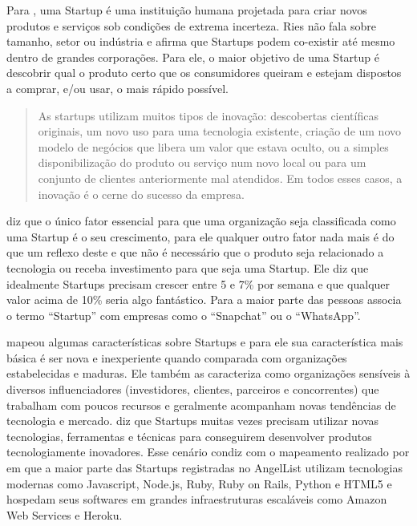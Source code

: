 Para , uma Startup é uma instituição humana projetada para criar novos produtos e serviços sob condições de extrema incerteza. Ries não fala sobre tamanho, setor ou indústria e afirma que Startups podem co-existir até mesmo dentro de grandes corporações. Para ele, o maior objetivo de uma Startup é descobrir qual o produto certo que os consumidores queiram e estejam dispostos a comprar, e/ou usar, o mais rápido possível. 

\begin{quote}
As startups utilizam muitos tipos de inovação: descobertas científicas originais, um novo uso para uma tecnologia existente, criação de um novo modelo de negócios que libera um valor que estava oculto, ou a simples disponibilização do produto ou serviço num novo local ou para um conjunto de clientes anteriormente mal atendidos. Em todos esses casos, a inovação é o cerne do sucesso da empresa. \cite{Ries2011}
\end{quote}

 diz que o único fator essencial para que uma organização seja classificada como uma Startup é o seu crescimento, para ele qualquer outro fator nada mais é do que um reflexo deste e que não é necessário que o produto seja relacionado a tecnologia ou receba investimento para que seja uma Startup. Ele diz que idealmente Startups precisam crescer entre 5 e 7\% por semana e que qualquer valor acima de 10\% seria algo fantástico. Para  a maior parte das pessoas associa o termo ``Startup'' com empresas como o ``Snapchat'' ou o ``WhatsApp''.

 mapeou algumas características sobre Startups e para ele sua característica mais básica é ser nova e inexperiente quando comparada com organizações estabelecidas e maduras. Ele também as caracteriza como organizações sensíveis à diversos influenciadores (investidores, clientes, parceiros e concorrentes) que trabalham com poucos recursos e geralmente acompanham novas tendências de tecnologia e mercado.  diz que Startups muitas vezes precisam utilizar novas tecnologias, ferramentas e técnicas para conseguirem desenvolver produtos tecnologiamente inovadores. Esse cenário condiz com o mapeamento realizado por  em que a maior parte das Startups registradas no AngelList utilizam tecnologias modernas como Javascript, Node.js, Ruby, Ruby on Rails, Python e HTML5 e hospedam seus softwares em grandes infraestruturas escaláveis como Amazon Web Services e Heroku.


